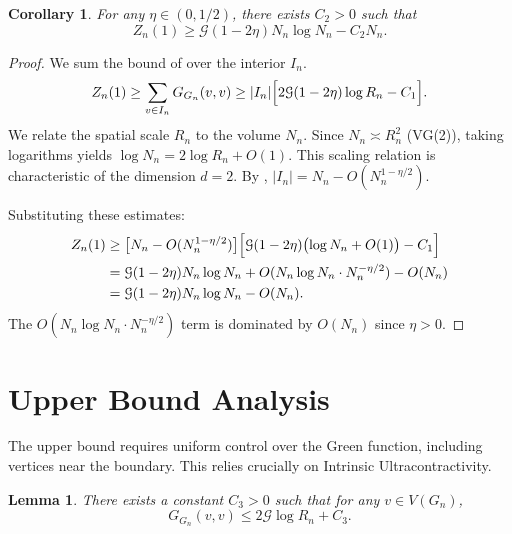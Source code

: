 \documentclass{article}
\numberwithin{equation}{section}
\newtheorem{lemma}[theorem]{Lemma}
\newtheorem{corollary}[theorem]{Corollary}
\theoremstyle{definition}
\theoremstyle{remark}
\newcommand{\cG}{\mathcal{G}}
\begin{document}
\begin{corollary}\label{cor:lower}
For any $\eta \in (0,1/2)$, there exists $C_2 > 0$ such that
\[
Z_n(1) \geq \cG(1-2\eta) N_n \log N_n - C_2 N_n.
\]
\end{corollary}

\begin{proof}
We sum the bound of  over the interior $I_n$.
\[
Z_n(1) \geq \sum_{v \in I_n} G_{G_n}(v,v) \geq |I_n|\Bigl[2\cG(1-2\eta)\log R_n - C_1\Bigr].
\]
We relate the spatial scale $R_n$ to the volume $N_n$. Since $N_n \asymp R_n^2$ (VG(2)), taking logarithms yields $\log N_n = 2\log R_n + O(1)$. This scaling relation is characteristic of the dimension $d=2$. By , $|I_n| = N_n - O(N_n^{1-\eta/2})$.

Substituting these estimates:
\begin{align*}
Z_n(1) &\geq \bigl[N_n - O(N_n^{1-\eta/2})\bigr]
          \Bigl[\cG(1-2\eta)\bigl(\log N_n + O(1)\bigr) - C_1\Bigr] \\
&= \cG(1-2\eta) N_n \log N_n + O(N_n \log N_n \cdot N_n^{-\eta/2}) - O(N_n) \\
&= \cG(1-2\eta) N_n \log N_n - O(N_n).\qedhere
\end{align*}
The $O(N_n \log N_n \cdot N_n^{-\eta/2})$ term is dominated by $O(N_n)$ since $\eta>0$.
\end{proof}

\section{Upper Bound Analysis}\label{sec:upper_bound}

The upper bound requires uniform control over the Green function, including vertices near the boundary. This relies crucially on Intrinsic Ultracontractivity.

\begin{lemma}\label{lem:upper}
There exists a constant $C_3 > 0$ such that for any $v \in V(G_n)$,
\[
G_{G_n}(v,v) \leq 2\cG \log R_n + C_3.
\]
\end{lemma}
\end{document}
